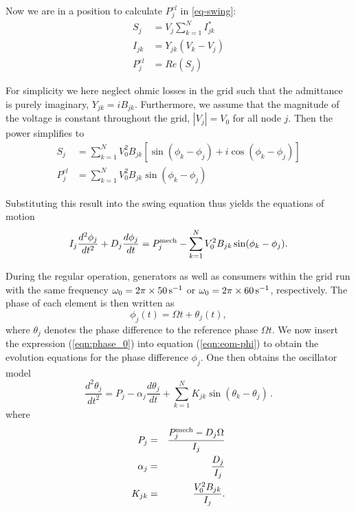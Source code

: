 \documentclass[10pt,aps,pra,twocolumn,superscriptaddress]{revtex4-1}
\newcommand{\be}{\begin{equation}}
\newcommand{\ee}{\end{equation}}
\newcommand{\bea}{\begin{eqnarray}}
\newcommand{\eea}{\end{eqnarray}}
\newcommand{\nn}{\nonumber}
\begin{document}
Now we are in a position to calculate ${P_j^{el}}$ in \eqref{eq-swing}:
\begin{equation}
\label{}
\begin{aligned}
S_j&= V_j \sum_{k=1}^N  I_{jk}^*\\
I_{jk}&= Y_{jk} (V_k - V_j)\\
P_j^{el}&=Re(S_j)
\end{aligned}
\end{equation}

For simplicity we here neglect ohmic losses in the grid such that
the admittance  is purely imaginary, $Y_{jk} = i B_{jk}$. Furthermore,
 we assume that the magnitude of the voltage is constant throughout
the grid, $|V_j| = V_0$ for all node $j$. Then the power
simplifies to
\begin{equation}
\label{}
\begin{aligned}
S_j &=  \sum_{k=1}^N  V_0^2 B_{jk} \left[  \sin(\phi_k - \phi_j)  + i \cos(\phi_k - \phi_j)  \right]\\
P_j^{el}&=\sum_{k=1}^N  V_0^2 B_{jk}\sin(\phi_k - \phi_j) 
\end{aligned}
\end{equation}

Substituting this result into the swing equation thus yields
the equations of motion
\be
   I_j \frac{d^2 \phi_j}{dt^2} + D_j \frac{d \phi_j}{dt}
    = P_j^{\rm mech}  - \sum_{k=1}^N  V_0^2 B_{jk}  \sin(\phi_k - \phi_j).
   \label{eqn:eom-phi}
\ee

During the regular operation, generators as well  as consumers within the 
grid run with the same frequency 
$\omega_0 = 2 \pi \times 50 \, {\rm s}^{-1}$  or 
$\omega_0 = 2 \pi \times 60 \, {\rm s}^{-1}$, respectively. 
The phase of each element is then written as
\begin{equation}
\label{eqn:phase_0}
	\phi_j(t) = \Omega t + \theta_j(t),
\end{equation}	
where $\theta_j$ denotes the phase difference to the reference 
phase $\Omega t$. We now insert the expression (\ref{eqn:phase_0}) 
into equation (\ref{eqn:eom-phi}) to obtain the evolution equations for the
phase difference $\phi_j$. One then obtains the oscillator model
\begin{equation}
   \frac{d^2 \theta_j}{dt^2} = P_j - \alpha_j \frac{d \theta_j}{dt}
          + \sum_{k=1}^N K_{jk}\sin(\theta_k - \theta_j) \, .
        \label{eqn:osc-model}  
\end{equation}
where
\bea
     P_j &=& \frac{P_j^{\rm mech} - D_j \Omega}{I_j} \nn \\
     \alpha_j &=& \frac{D_j}{I_j}  \nn \\
    K_{jk} &=& \frac{V_0^2 B_{jk}}{I_j}. \nn
\eea
\end{document}
